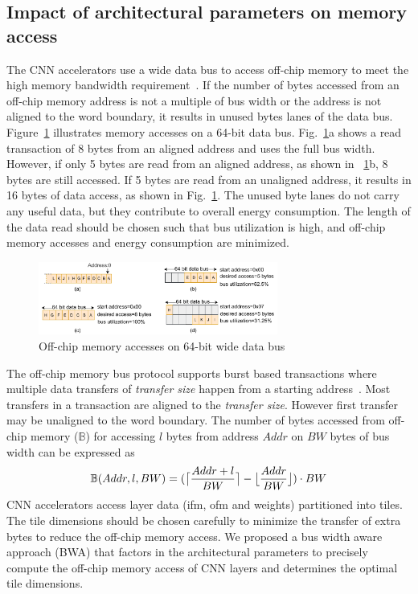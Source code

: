 \documentclass[a4paper,10pt]{article}
\DeclarePairedDelimiter{\ceil}{\lceil}{\rceil}
\DeclarePairedDelimiter\floor{\lfloor}{\rfloor}
\newcommand{\numBytesOffChip}{\mathbb{B}}
\newcommand{\busWidth}{BW}
\newcommand{\dataLength}{l}
\newcommand{\addressSym}{Addr}
\begin{document}
\subsection{Impact of architectural parameters on memory access}\label{sec:OffChipAccessModel}
The CNN accelerators use a wide data bus to access off-chip memory to meet the high memory bandwidth requirement~\cite{Chen2016EyerissAS,chen2014diannao}. If the number of bytes accessed from an off-chip memory address is not a multiple of bus width or the address is not aligned to the word boundary, it results in unused bytes lanes of the data bus. Figure~\ref{fig:AXI_AccesseOn64BitDataBus} illustrates memory accesses on a 64-bit data bus.  Fig.~\ref{fig:AXI_AccesseOn64BitDataBus}a shows a read transaction of 8 bytes from an aligned address and uses the full bus width. However, if only 5 bytes are read from an aligned address, as shown in \figurename~\ref{fig:AXI_AccesseOn64BitDataBus}b, 8 bytes are still accessed. If 5 bytes are read from an unaligned address, it results in 16 bytes of data access, as shown in Fig.~\ref{fig:AXI_AccesseOn64BitDataBus}. The unused byte lanes do not carry any useful data, but they contribute to overall energy consumption. The length of the data read should be chosen such that bus utilization is high, and off-chip memory accesses and energy consumption are minimized.
\begin{figure}[!htb]
	\centering
    \captionsetup{font=sf}	
	\includegraphics[width=0.7\textwidth]{./images/BurstTranscationOnAXI}
	\caption{Off-chip memory accesses on 64-bit wide data bus}
	\label{fig:AXI_AccesseOn64BitDataBus}
\end{figure}
The off-chip memory bus protocol supports burst based transactions where multiple data transfers of \emph{transfer size} happen from a starting address~\cite{AxiProtocolSpec}. Most transfers in a transaction are aligned to the \emph{transfer size}. However first transfer may be unaligned to the word boundary. 
The number of bytes accessed from off-chip memory ($\numBytesOffChip$) for accessing $\dataLength$ bytes from address $\addressSym$ on $\busWidth$ bytes of bus width can be expressed as
\begin{equation}\label{eq:accessfromUnalignedAddr}
	\begin{aligned}
		\numBytesOffChip(\addressSym,\dataLength,\busWidth)=(\ceil[\big]{\frac{\addressSym+\dataLength}{\busWidth}}-\floor[\big]{\frac{\addressSym}{\busWidth}})\cdot{\busWidth}
	\end{aligned}
\end{equation}
CNN accelerators access layer data (ifm, ofm and weights) partitioned into tiles. The tile dimensions should be chosen carefully to
minimize the transfer of extra bytes to reduce the off-chip memory access. We proposed a bus width aware approach (BWA) that factors in the architectural parameters to precisely compute the off-chip memory access of CNN layers and determines the optimal tile dimensions.
\end{document}
